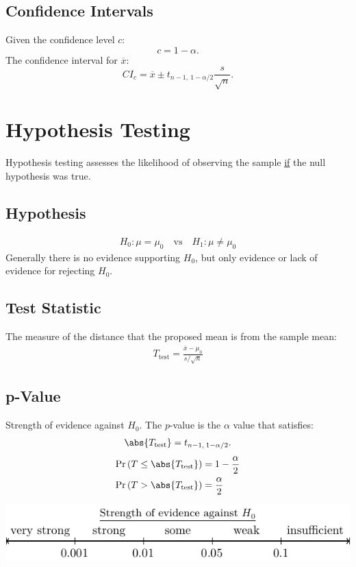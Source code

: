 \documentclass{article}
\begin{document}
\begin{minipage}{126.1962963mm}
    \begin{multicols*}{2}
        \subsection*{Confidence Intervals}
        Given the confidence level \(c\):
        \begin{equation*}
            c = 1 - \alpha.
        \end{equation*}
        The confidence interval for \(\overline{x}\):
        \begin{equation*}
            {CI}_{c} = \overline{x} \pm t_{n-1,\: 1-\alpha/2} \frac{s}{\sqrt{n}}.
        \end{equation*}
        \section*{Hypothesis Testing}
        Hypothesis testing assesses the likelihood of observing the sample \underline{if} the null hypothesis was true.
        \subsection*{Hypothesis}
        \begin{align*}
            H_0:\mu = \mu_0 \quad \text{vs} \quad H_1:\mu \neq \mu_0
        \end{align*}
        Generally there is no evidence supporting \(H_0\), but only evidence or lack of evidence for rejecting \(H_0\).
        \subsection*{Test Statistic}
        The measure of the distance that the proposed mean is from the sample mean:
        \begin{align*}
            T_{\text{test}} = \frac{\overline{x} - \mu_0}{s/\sqrt{n}}
        \end{align*}
        \subsection*{p-Value}
        Strength of evidence against \(H_0\). The \(p\)-value is the \(\alpha\) value that satisfies:
        \begin{equation*}
            \abs{T_{\text{test}}} = t_{n-1,\: 1-\alpha/2}.
        \end{equation*}
        \begin{align*}
            \Pr{\left( T \leq \abs{T_{\text{test}}} \right)} & = 1 - \frac{\alpha}{2} \\
            \Pr{\left( T > \abs{T_{\text{test}}} \right)}    & = \frac{\alpha}{2}
        \end{align*}
    \end{multicols*}
    \includegraphics[width = \linewidth, keepaspectratio = true]{figures/p_values}
\end{minipage}
\end{document}
